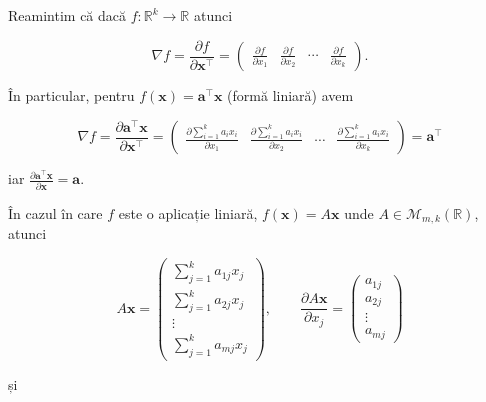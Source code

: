 \documentclass[]{article}
\begin{document}
Reamintim că dacă \(f:\mathbb{R}^k\to\mathbb{R}\) atunci

\[
\nabla f = \frac{\partial f}{\partial \boldsymbol x^\intercal} = \begin{pmatrix}\frac{\partial f}{\partial x_1} & \frac{\partial f}{\partial x_2} & \cdots & \frac{\partial f}{\partial x_k}\end{pmatrix}.
\]

În particular, pentru
\(f(\boldsymbol x) = \boldsymbol a^\intercal \boldsymbol x\) (formă
liniară) avem

\[
  \nabla f = \frac{\partial \boldsymbol a^\intercal \boldsymbol x}{\partial \boldsymbol x^\intercal} = \begin{pmatrix}\frac{\partial \sum_{i=1}^{k}a_i x_i}{\partial x_1} & \frac{\partial \sum_{i=1}^{k}a_i x_i}{\partial x_2} & \cdots & \frac{\partial \sum_{i=1}^{k}a_i x_i}{\partial x_k}\end{pmatrix} = \boldsymbol a^\intercal
\]

iar
\(\frac{\partial \boldsymbol a^\intercal \boldsymbol x}{\partial \boldsymbol x} = \boldsymbol a\).

În cazul în care \(f\) este o aplicație liniară,
\(f(\boldsymbol x) = A \boldsymbol x\) unde
\(A\in\mathcal{M}_{m,k}(\mathbb{R})\), atunci

\[
  A \boldsymbol x = \begin{pmatrix}\sum_{j=1}^{k}a_{1j} x_j\\
  \sum_{j=1}^{k}a_{2j} x_j\\
  \vdots\\
  \sum_{j=1}^{k}a_{mj} x_j\end{pmatrix}, \qquad \frac{\partial A \boldsymbol x}{\partial x_j} = \begin{pmatrix}a_{1j}\\
  a_{2j}\\
  \vdots\\
  a_{mj}\end{pmatrix}
\]

și
\end{document}
